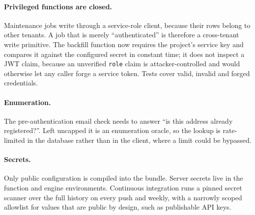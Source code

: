 \documentclass[10pt,a4paper,twocolumn]{article}
\begin{document}
\begin{table}[t]
\centering
\caption{Data classification by store. ``Supplied'' means only when a user explicitly
includes it in a request.}
\label{tab:classification}
\scriptsize
\setlength{\tabcolsep}{3pt}
\end{table}

\paragraph{Privileged functions are closed.}
Maintenance jobs write through a service-role client, because their rows belong to
other tenants. A job that is merely ``authenticated'' is therefore a cross-tenant
write primitive. The backfill function now requires the project's service key and
compares it against the configured secret in constant time; it does not inspect a
JWT claim, because an unverified \texttt{role} claim is attacker-controlled and would
otherwise let any caller forge a service token. Tests cover valid, invalid and forged
credentials.

\paragraph{Enumeration.}
The pre-authentication email check needs to answer ``is this address already
registered?''. Left uncapped it is an enumeration oracle, so the lookup is rate-limited
in the database rather than in the client, where a limit could be bypassed.

\paragraph{Secrets.}
Only public configuration is compiled into the bundle. Server secrets live in the
function and engine environments. Continuous integration runs a pinned secret scanner
over the full history on every push and weekly, with a narrowly scoped allowlist for
values that are public by design, such as publishable API keys.
\end{document}
